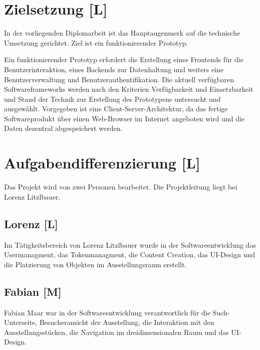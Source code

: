 \section{Zielsetzung [L]}
In der vorliegenden Diplomarbeit ist das Hauptaugenmerk auf die technische Umsetzung gerichtet. Ziel ist ein funktionierender Prototyp.

Ein funktionierender Prototyp erfordert die Erstellung eines Frontends für die Benutzerinteraktion, eines Backends zur Datenhaltung und weiters eine Benutzerverwaltung und Benutzerauthentifikation. Die aktuell verfügbaren Softwareframeworks werden nach den Kriterien Verfügbarkeit und Einsetzbarkeit und Stand der Technik zur Erstellung des Prototypens untersucht und ausgewählt. Vorgegeben ist eine Client-Server-Architektur, da das fertige Softwareprodukt über einen Web-Browser im Internet angeboten wird und die Daten dezentral abgespeichert werden.

\section{Aufgabendifferenzierung [L]}
Das Projekt wird von zwei Personen bearbeitet. Die Projektleitung liegt bei Lorenz Litzlbauer. 

\subsection{Lorenz [L]}
Im Tätigkeitsbereich von Lorenz Litzlbauer wurde in der Softwareentwicklung das 
Usermanagment, 
das Tokenmanagment,
die Content Creation,
das UI-Design 
und die Platzierung von Objekten im Ausstellungsraum erstellt.

\subsection{Fabian [M]}
 Fabian Maar war in der Softwareentwicklung verantwortlich für die Such-Unterseite, Besucheransicht der Ausstellung, die Interaktion mit den Ausstellungsstücken, die Navigation im dreidimensionalen Raum und das UI-Design.
	
